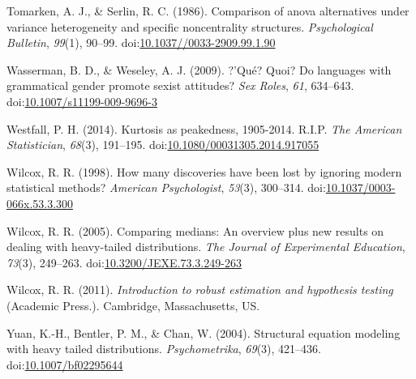 \documentclass[man,floatsintext]{apa6}
\begin{document}
\leavevmode\hypertarget{ref-Tomarken_and_Serlin_1986}{}%
Tomarken, A. J., \& Serlin, R. C. (1986). Comparison of anova alternatives under variance heterogeneity and specific noncentrality structures. \emph{Psychological Bulletin}, \emph{99}(1), 90--99. doi:\href{https://doi.org/10.1037//0033-2909.99.1.90}{10.1037//0033-2909.99.1.90}

\leavevmode\hypertarget{ref-Wasserman_and_Weseley_2009}{}%
Wasserman, B. D., \& Weseley, A. J. (2009). ?'Qué? Quoi? Do languages with grammatical gender promote sexist attitudes? \emph{Sex Roles}, \emph{61}, 634--643. doi:\href{https://doi.org/10.1007/s11199-009-9696-3}{10.1007/s11199-009-9696-3}

\leavevmode\hypertarget{ref-Westfall_2014}{}%
Westfall, P. H. (2014). Kurtosis as peakedness, 1905-2014. R.I.P. \emph{The American Statistician}, \emph{68}(3), 191--195. doi:\href{https://doi.org/10.1080/00031305.2014.917055}{10.1080/00031305.2014.917055}

\leavevmode\hypertarget{ref-Wilcox_1998}{}%
Wilcox, R. R. (1998). How many discoveries have been lost by ignoring modern statistical methods? \emph{American Psychologist}, \emph{53}(3), 300--314. doi:\href{https://doi.org/10.1037/0003-066x.53.3.300}{10.1037/0003-066x.53.3.300}

\leavevmode\hypertarget{ref-Wilcox_2005}{}%
Wilcox, R. R. (2005). Comparing medians: An overview plus new results on dealing with heavy-tailed distributions. \emph{The Journal of Experimental Education}, \emph{73}(3), 249--263. doi:\href{https://doi.org/10.3200/JEXE.73.3.249-263}{10.3200/JEXE.73.3.249-263}

\leavevmode\hypertarget{ref-Wilcox_2011}{}%
Wilcox, R. R. (2011). \emph{Introduction to robust estimation and hypothesis testing} (Academic Press.). Cambridge, Massachusetts, US.

\leavevmode\hypertarget{ref-Yuan_et_al_2004}{}%
Yuan, K.-H., Bentler, P. M., \& Chan, W. (2004). Structural equation modeling with heavy tailed distributions. \emph{Psychometrika}, \emph{69}(3), 421--436. doi:\href{https://doi.org/10.1007/bf02295644}{10.1007/bf02295644}

\clearpage
\makeatletter
\efloat@restorefloats
\makeatother
\end{document}
